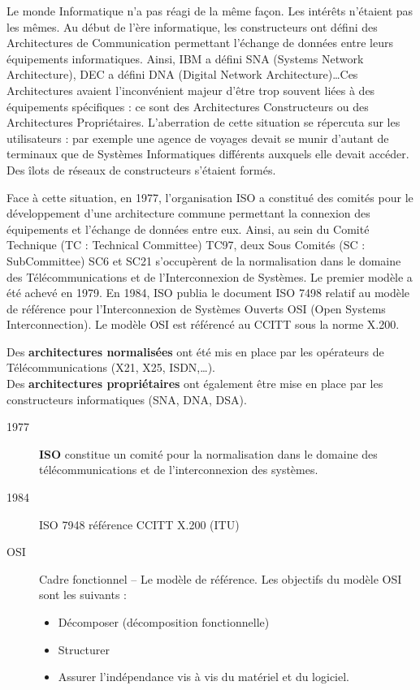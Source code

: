 Le monde Informatique n'a pas réagi de la même façon. Les intérêts n'étaient pas les mêmes. Au début de l'ère informatique, les constructeurs ont défini des Architectures de Communication permettant l'échange de données entre leurs équipements informatiques. Ainsi, IBM a défini SNA (Systems Network Architecture), DEC a défini DNA (Digital Network Architecture)\ldots Ces Architectures avaient l'inconvénient majeur d'être trop souvent liées à des équipements spécifiques : ce sont des Architectures Constructeurs ou des Architectures Propriétaires. L'aberration de cette situation se répercuta sur les utilisateurs : par exemple une agence de voyages devait se munir d'autant de terminaux que de Systèmes Informatiques différents auxquels elle devait accéder. Des îlots de réseaux de constructeurs s'étaient formés.

Face à cette situation, en 1977, l'organisation ISO a constitué des comités pour le développement d'une architecture commune permettant la connexion des équipements et l'échange de données entre eux. Ainsi, au sein du Comité Technique (TC : Technical Committee) TC97, deux Sous Comités (SC : SubCommittee) SC6 et SC21 s'occupèrent de la normalisation dans le domaine des Télécommunications et de l'Interconnexion de Systèmes. Le premier modèle a été achevé en 1979. En 1984, ISO publia le document ISO 7498 relatif au modèle de référence pour l'Interconnexion de Systèmes Ouverts OSI (Open Systems Interconnection). Le modèle OSI est référencé au CCITT sous la norme X.200. 

	Des \textbf{architectures normalisées} ont été mis en place par les opérateurs de Télécommunications (X21, X25, ISDN,\ldots).\\
	Des \textbf{architectures propriétaires} ont également être mise en place par les constructeurs informatiques (SNA, DNA, DSA).\\
	\begin{description}
		\item[1977] \textbf{ISO} constitue un comité pour la normalisation dans le domaine des télécommunications et de l'interconnexion des systèmes.\\
		\item[1984] ISO 7948 référence CCITT X.200 (ITU)
		\item[OSI] Cadre fonctionnel -- Le modèle de référence. Les objectifs du modèle OSI sont les suivants : 
			\begin{itemize}
				\item Décomposer (décomposition fonctionnelle)
				\item Structurer
				\item Assurer l'indépendance vis à vis du matériel et du logiciel.
			\end{itemize}
	\end{description}
